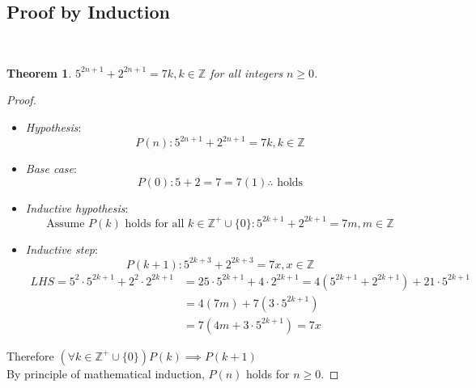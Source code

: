 \documentclass[a4paper,twoside,10pt]{article}
\newenvironment{examquestion}[1]{%
	\mbox{}\\\tcolorbox[beamer,breakable,%
	title=Exam-style Question: #1,standard jigsaw,opacityback=0, colframe=red!75!black, boxrule=2pt]}{\endtcolorbox\mbox{}\\}
\newtheorem*{theorem*}{Theorem}
\begin{document}
		\subsection{Proof by Induction}
			\begin{examquestion}{University of Waikato Induction Problems Set Proof 18}
				\begin{theorem*}
					$5^{2n+1}+2^{2n+1}=7k,k\in\mathbb{Z}$ for all integers $n\geq0$.
				\end{theorem*}
				\begin{proof}
					\begin{itemize}[label=$\lozenge$, itemsep=4ex]
						\item \emph{Hypothesis}:
						\[
						P(n): 5^{2n+1}+2^{2n+1}=7k,k\in\mathbb{Z}
						\]
						\item \emph{Base case}:
						\[
							P(0): 5+2=7=7(1)\therefore\text{ holds}
						\]
						\item \emph{Inductive hypothesis}:
						\[
							\text{Assume }P(k)\text{ holds for all }k\in\mathbb{Z}^+\cup\{0\}: 5^{2k+1}+2^{2k+1}=7m,m\in\mathbb{Z}
						\]
						\item \emph{Inductive step}:
						\[
							P(k+1): 5^{2k+3}+2^{2k+3}=7x,x\in\mathbb{Z}
						\]
						\begin{align*}
							LHS=5^2\cdot5^{2k+1}+2^2\cdot2^{2k+1}&=25\cdot5^{2k+1}+4\cdot2^{2k+1}=4\left(5^{2k+1}+2^{2k+1}\right)+21\cdot5^{2k+1}\\
							&=4(7m)+7(3\cdot5^{2k+1})\\
							&=7(4m+3\cdot5^{2k+1})=7x
						\end{align*}
					\end{itemize}
					Therefore $(\forall k\in\mathbb{Z}^+\cup\{0\})P(k)\implies P(k+1)$\\
					By principle of mathematical induction, $P(n)$ holds for $n\geq0$.
				\end{proof}
			\end{examquestion}
\end{document}
